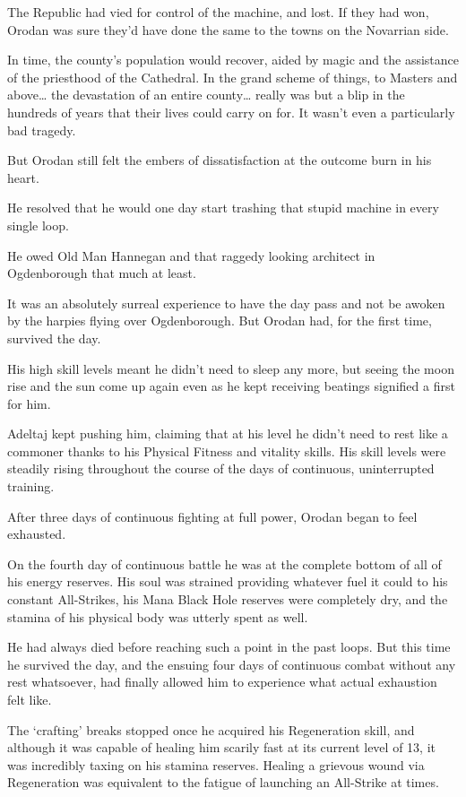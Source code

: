 \documentclass[a4paper,10pt]{book}
\begin{document}
The Republic had vied for control of the machine, and lost. If they had won, Orodan was sure they’d have done the same to the towns on the Novarrian side.\par
In time, the county’s population would recover, aided by magic and the assistance of the priesthood of the Cathedral. In the grand scheme of things, to Masters and above… the devastation of an entire county… really was but a blip in the hundreds of years that their lives could carry on for. It wasn’t even a particularly bad tragedy.\par
But Orodan still felt the embers of dissatisfaction at the outcome burn in his heart.\par
He resolved that he would one day start trashing that stupid machine in every single loop.\par
He owed Old Man Hannegan and that raggedy looking architect in Ogdenborough that much at least.\par
\par
It was an absolutely surreal experience to have the day pass and not be awoken by the harpies flying over Ogdenborough. But Orodan had, for the first time, survived the day.\par
His high skill levels meant he didn’t need to sleep any more, but seeing the moon rise and the sun come up again even as he kept receiving beatings signified a first for him.\par
Adeltaj kept pushing him, claiming that at his level he didn’t need to rest like a commoner thanks to his Physical Fitness and vitality skills. His skill levels were steadily rising throughout the course of the days of continuous, uninterrupted training.\par
After three days of continuous fighting at full power, Orodan began to feel exhausted.\par
On the fourth day of continuous battle he was at the complete bottom of all of his energy reserves. His soul was strained providing whatever fuel it could to his constant All-Strikes, his Mana Black Hole reserves were completely dry, and the stamina of his physical body was utterly spent as well.\par
He had always died before reaching such a point in the past loops. But this time he survived the day, and the ensuing four days of continuous combat without any rest whatsoever, had finally allowed him to experience what actual exhaustion felt like.\par
The ‘crafting’ breaks stopped once he acquired his Regeneration skill, and although it was capable of healing him scarily fast at its current level of 13, it was incredibly taxing on his stamina reserves. Healing a grievous wound via Regeneration was equivalent to the fatigue of launching an All-Strike at times.\par
\end{document}
